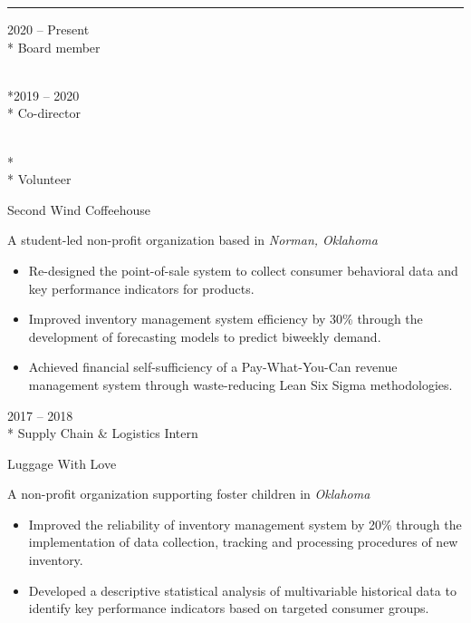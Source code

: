 \documentclass[a4paper,10pt]{article}
\newlength{\cvcolumngapwidth}
\newlength{\cvleftcolumnwidth}
\newlength{\cvrightcolumnwidth}
\newcommand{\cvsectionstyle}[1]{{\cvsectionfont\textcolor{cvsectioncolor}{#1}}}
\newcommand{\cvtitlestyle}[1]{{\large\cvtitlefont\textcolor{cvtitlecolor}{#1}}}
\newcommand{\cvdurationstyle}[1]{{\small\cvdurationfont\textcolor{cvdurationcolor}{#1}}}
\newlength{\cvafteritemskipamount}
\newlength{\cvaftersectionskipamount}
\newlength{\cvaftertitleskipamount}
\newlength{\cvparskip}
\newcommand{\cvsection}[1]{
    \begin{minipage}[t]{\cvleftcolumnwidth}
        \raggedleft\cvsectionstyle{#1}
    \end{minipage}%
    \hspace{\cvcolumngapwidth}%
    \begin{minipage}[t]{\cvrightcolumnwidth}
        \textcolor{cvrulecolor}{\rule{\cvrightcolumnwidth}{0.3mm}}
    \end{minipage}

    \vspace{\cvaftersectionskipamount}
}
\newcommand{\cvitem}[2]{
    \begin{minipage}[t]{\cvleftcolumnwidth}
        \raggedleft #1
    \end{minipage}%
    \hspace{\cvcolumngapwidth}%
    \begin{minipage}[t]{\cvrightcolumnwidth}
        \setlength{\parskip}{\cvparskip} #2
    \end{minipage}

    \vspace{\cvafteritemskipamount}
}
\newcommand{\cvtitle}[1]{
    \cvtitlestyle{#1}

    \vspace{\cvaftertitleskipamount}
    \vspace{-\cvparskip}
}
\begin{document}
\vspace{-0.15cm}

\cvsection{PROFESSIONAL EXPERIENCE}
\vspace{0.15cm}

\cvitem{
\cvdurationstyle{2020 -- Present}
\\* Board member
\vspace{0.15cm}

\\*\cvdurationstyle{2019 -- 2020}
\\* Co-director
\vspace{0.15cm}

\\*\hspace{0.3cm}\cvdurationstyle{2017 -- 2019}
\\* Volunteer
}{
    \cvtitle{Second Wind Coffeehouse}

    A student-led non-profit organization based in \emph{Norman, Oklahoma}
    \vspace{0.15cm}
    
    \begin{itemize}[leftmargin=*]
    
        \item Re-designed the point-of-sale system to collect consumer behavioral data and key performance indicators for products.
        \item Improved inventory management system efficiency by 30\% through the development of forecasting models to predict biweekly demand.
        \item Achieved financial self-sufficiency of a Pay-What-You-Can revenue management system through waste-reducing Lean Six Sigma methodologies.
        
    \end{itemize}
}

\cvitem{
\cvdurationstyle{2017 -- 2018}
\\* Supply Chain \& Logistics Intern
}{
    \cvtitle{Luggage With Love}

    A non-profit organization supporting foster children in \emph{Oklahoma}
    \vspace{0.15cm}
    
    \begin{itemize}[leftmargin=*]
    
        \item Improved the reliability of inventory management system by 20\% through the implementation of data collection, tracking and processing procedures of new inventory.
        \item Developed a descriptive statistical analysis of multivariable historical data to identify key performance indicators based on targeted consumer groups.
        
    \end{itemize}
    
}
\end{document}
